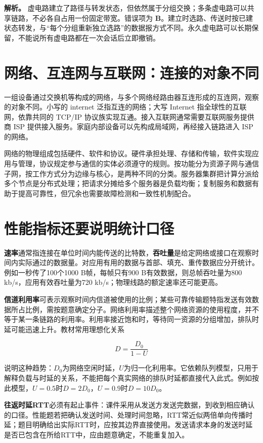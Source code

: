 \textbf{解析。} 虚电路建立了路径与转发状态，但依然属于分组交换；多条虚电路可以共享链路，不必各自占用一份固定带宽。错误项为 \textbf{B}。建立时选路、传送时按已建状态转发，与``每个分组重新独立选路''的数据报方式不同。永久虚电路可以长期保留，不能说所有虚电路都在一次会话后立即撤销。

\section{网络、互连网与互联网：连接的对象不同}\label{CN01-course-internet}

一组设备通过交换机等构成的网络，与多个网络经路由器互连形成的互连网，观察的对象不同。小写的 internet 泛指互连的网络；大写 Internet 指全球性的互联网，依靠共同的 TCP/IP 协议族实现互通。接入互联网通常需要互联网服务提供商 ISP 提供接入服务。家庭内部设备可以先构成局域网，再经接入链路进入 ISP 的网络。

网络的物理组成包括硬件、软件和协议。硬件承担处理、存储和传输，软件实现应用与管理，协议规定参与通信的实体必须遵守的规则。按功能分为资源子网与通信子网，按工作方式分为边缘与核心，是两种不同的分类。服务器集群把计算分派给多个节点是分布式处理；把请求分摊给多个服务器是负载均衡；复制服务和数据有助于提高可靠性，但冗余也需要故障检测和一致性机制配合。

\section{性能指标还要说明统计口径}\label{CN01-course-metrics}

\textbf{速率}通常指连接在单位时间内能传送的比特数，\textbf{吞吐量}是给定网络或接口在观察时间内实际通过的数据量。对应用有用的数据与首部、填充、重传数据应分开统计。例如一秒传了100个1000 B帧，每帧只有900 B有效数据，则总帧吞吐量为800 kb/s，应用有效吞吐量为720 kb/s；物理线路的额定速率还可能更高。

\textbf{信道利用率}可表示观察时间内信道被使用的比例；某些可靠传输题特指发送有效数据所占比例，需按题意确定分子。网络利用率描述整个网络资源的使用程度，并不等于某一条链路的利用率。利用率接近饱和时，等待同一资源的分组增加，排队时延可能迅速上升。教材常用理想化关系

\[D=\frac{D_0}{1-U}\]

说明这种趋势：\(D_0\)为网络空闲时延，\(U\)为归一化利用率。它依赖队列模型，只用于解释负载与时延的关系，不能把每个真实网络的排队时延都直接代入此式。例如按此模型，\(U=0.5\)时\(D=2D_0\)，\(U=0.9\)时\(D=10D_0\)。

\textbf{往返时延RTT}必须有起止事件：课件采用从发送方发送完数据，到收到相应确认的口径。性能题若把确认发送时间、处理时间忽略，RTT常近似两倍单向传播时延；题目明确给出实际RTT时，应按其边界直接使用。发送请求本身的发送时延是否已包含在所给RTT中，应由题意确定，不能重复加入。

